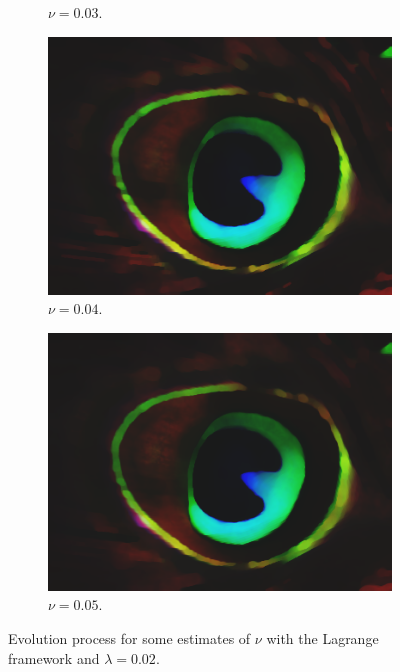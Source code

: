 \documentclass[abstracton]{scrreprt}
\begin{document}
\begin{figure}[!ht]
\begin{subfigure}[b]{0.24\textwidth}
                    \caption{$\nu = 0.03$.}
                \end{subfigure}
                \begin{subfigure}[b]{0.24\textwidth}
                    \includegraphics[width=\textwidth]{img/segmentation/cr/004peacock-feather.png}
                    \caption{$\nu = 0.04$.}
                \end{subfigure}
                \begin{subfigure}[b]{0.24\textwidth}
                    \includegraphics[width=\textwidth]{img/segmentation/cr/005peacock-feather.png}
                    \caption{$\nu = 0.05$.}
                \end{subfigure}
                \caption[Evolution process for image segmentation with Lagrange Mumford-Shah.]{Evolution process for some estimates of $\nu$ with the Lagrange framework and $\lambda = 0.02$.}
            \label{fig:segmentation_evolution_test_images_cr}
            \end{figure}
\end{document}
